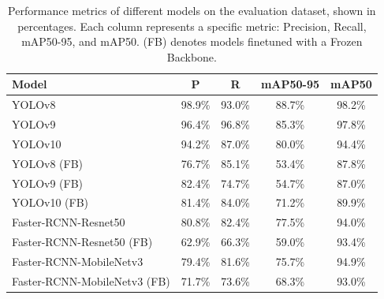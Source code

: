 \documentclass[10pt,twocolumn,letterpaper]{article}
\begin{document}
\begin{table}[thb]
    \scriptsize
    \centering
    \begin{tabular}{lcccc}
        \toprule
        \textbf{Model}          & \textbf{P} & \textbf{R} & \textbf{mAP50-95} & \textbf{mAP50} \\
        \midrule
        YOLOv8                  & 98.9\%     & 93.0\%     & 88.7\%            & 98.2\%         \\
        YOLOv9                  & 96.4\%     & 96.8\%     & 85.3\%            & 97.8\%         \\
        YOLOv10                 & 94.2\%     & 87.0\%     & 80.0\%            & 94.4\%         \\
        YOLOv8 (FB)             & 76.7\%     & 85.1\%     & 53.4\%            & 87.8\%         \\
        YOLOv9 (FB)             & 82.4\%     & 74.7\%     & 54.7\%            & 87.0\%         \\
        YOLOv10 (FB)            & 81.4\%     & 84.0\%     & 71.2\%            & 89.9\%         \\
        Faster-RCNN-Resnet50         & 80.8\%     & 82.4\%     & 77.5\%            & 94.0\%         \\
        Faster-RCNN-Resnet50 (FB)    & 62.9\%     & 66.3\%     & 59.0\%            & 93.4\%         \\
        Faster-RCNN-MobileNetv3      & 79.4\%     & 81.6\%     & 75.7\%            & 94.9\%         \\
        Faster-RCNN-MobileNetv3 (FB) & 71.7\%     & 73.6\%     & 68.3\%            & 93.0\%         \\
        \bottomrule
    \end{tabular}
    \caption{Performance metrics of different models on the evaluation dataset, shown in percentages. Each column represents a specific metric: Precision, Recall, mAP50-95, and mAP50. (FB) denotes models finetuned with a Frozen Backbone.}
    \label{tab:metrics-results}
\end{table}
\end{document}
